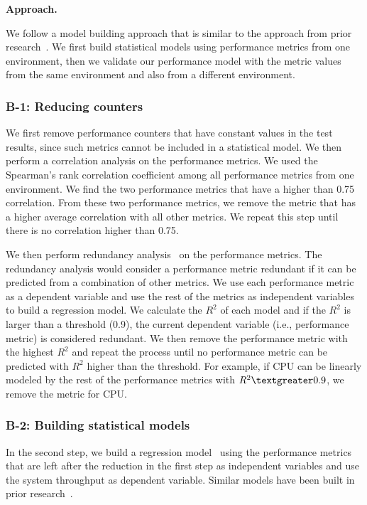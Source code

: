 \noindent \textbf{Approach. }

We follow a model building approach that is similar to the approach from prior research~\cite{Shang:2015:ADP:2668930.2688052,Cohen:2005:CIC:1095810.1095821,xiong2013vperfguard}. We first build statistical models using performance metrics from one environment, then we validate our performance model with the metric values from the same environment and also from a different environment.
\subsubsection{B-1: Reducing counters}

We first remove performance counters that have constant values in the test results, since such metrics cannot be included in a statistical model. We then perform a correlation analysis on the performance metrics. We used the Spearman's rank correlation coefficient among all performance metrics from one environment. We find the two performance metrics that have a higher than 0.75 correlation. From these two performance metrics, we remove the metric that has a higher average correlation with all other metrics. We repeat this step until there is no correlation higher than 0.75.


We then perform redundancy analysis~\cite{harrell2001regression} on the performance metrics. The redundancy analysis would consider a performance metric redundant if it can be predicted from a combination of other metrics. We use each performance metric as a dependent variable and use the rest of the metrics as independent variables to build a regression model. We calculate the $R^2$ of each model and if the $R^2$ is larger than a threshold (0.9), the current dependent variable (i.e., performance metric) is considered redundant. We then remove the performance metric with the highest $R^2$ and repeat the process until no performance metric can be predicted with $R^2$ higher than the threshold. For example, if CPU can be linearly modeled by the rest of the performance metrics with $R^2\textgreater0.9$, we remove the metric for CPU.

\subsubsection{B-2: Building statistical models}

In the second step, we build a regression model~\cite{freedman2009statistical} using the performance metrics that are left after the reduction in the first step as independent variables and use the system throughput as dependent variable. Similar models have been built in prior research~\cite{Cohen:2005:CIC:1095810.1095821,xiong2013vperfguard}.

